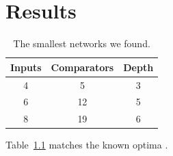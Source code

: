 \chapter{Results}\label{ch:results}
\begin{table}[h]
  \centering
  \begin{tabular}{|c|c|c|}
    \hline
    Inputs & Comparators & Depth \\ \hline
    4 & 5 & 3 \\
    6 & 12 & 5 \\
    8 & 19 & 6 \\ \hline
  \end{tabular}
  \caption{The smallest networks we found.}\label{tab:results}
\end{table}
Table~\ref{tab:results} matches the known optima \citep{codish2016}.
